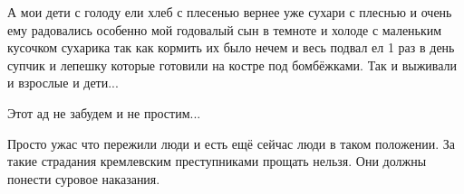 
А мои дети с голоду ели хлеб с плесенью вернее уже сухари с плеснью и очень ему
радовались особенно мой годовалый сын в темноте и холоде с маленьким кусочком
сухарика так как кормить их было нечем и весь подвал ел 1 раз в день супчик и
лепешку которые готовили на костре под бомбёжками. Так и выживали и взрослые и
дети...

Этот ад не забудем и не простим...


Просто ужас что пережили люди и есть ещё сейчас люди в таком положении. За такие
страдания кремлевским преступниками прощать нельзя. Они должны понести суровое
наказания.
